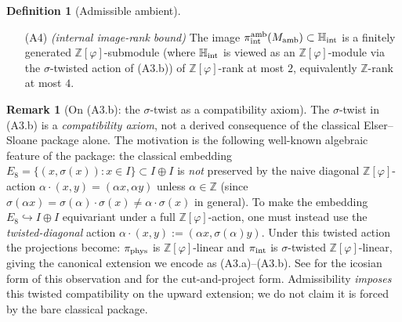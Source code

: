 \documentclass[11pt, a4paper]{amsart}
\theoremstyle{definition}
\newtheorem{definition}[theorem]{Definition}
\newtheorem{remark}[theorem]{Remark}
\newcommand{\R}{\mathbb{R}}
\newcommand{\Z}{\mathbb{Z}}
\newcommand{\HH}{\mathbb{H}}
\newcommand{\Ophi}{\mathbb{Z}[\varphi]}
\begin{document}
\begin{definition}[Admissible ambient]
\begin{enumerate}
\begin{enumerate}
    (the extensions restrict to the classical package on $E_8$).
  \item[\textup{(A3.d)}] $\pi_{\rm phys}^{\rm amb}|_{M_{\rm amb}
    \otimes \R} = 0$: the phason complement does not contribute
    to the physical target space; its role is only to enlarge
    the acceptance-window / internal parameterization.
  \end{enumerate}
\item[\textup{(A4)}] \emph{(internal image-rank bound)} The
  image $\pi_{\rm int}^{\rm amb}(M_{\rm amb}) \subset \HH_{\rm
  int}$ is a finitely generated $\Ophi$-submodule (where
  $\HH_{\rm int}$ is viewed as an $\Ophi$-module via the
  $\sigma$-twisted action of (A3.b)) of $\Ophi$-rank at most
  $2$, equivalently $\Z$-rank at most $4$.
\end{enumerate}
\end{definition}

\begin{remark}[On (A3.b): the $\sigma$-twist as a compatibility
  axiom]
\label{rmk:sigma-twist}
The $\sigma$-twist in (A3.b) is a \emph{compatibility axiom},
not a derived consequence of the classical Elser--Sloane
package alone. The motivation is the following well-known
algebraic feature of the package: the classical embedding
$E_8 = \{(x, \sigma(x)) : x \in I\} \subset I \oplus I$ is
\emph{not} preserved by the naive diagonal $\Ophi$-action
$\alpha \cdot (x, y) = (\alpha x, \alpha y)$ unless $\alpha
\in \Z$ (since $\sigma(\alpha x) = \sigma(\alpha) \cdot
\sigma(x) \neq \alpha \cdot \sigma(x)$ in general). To make
the embedding $E_8 \hookrightarrow I \oplus I$ equivariant
under a full $\Ophi$-action, one must instead use the
\emph{twisted-diagonal} action $\alpha \cdot (x, y) := (\alpha
x, \sigma(\alpha) y)$. Under this twisted action the
projections become: $\pi_{\rm phys}$ is $\Ophi$-linear and
$\pi_{\rm int}$ is $\sigma$-twisted $\Ophi$-linear, giving
the canonical extension we encode as (A3.a)--(A3.b). See
\cite[Ch.~8, \S2.2]{ConwaySloane} for the icosian form of
this observation and \cite[pp.~6162--6163]{ElserSloane} for
the cut-and-project form. Admissibility \emph{imposes} this
twisted compatibility on the upward extension; we do not
claim it is forced by the bare classical package.
\end{remark}
\end{document}
